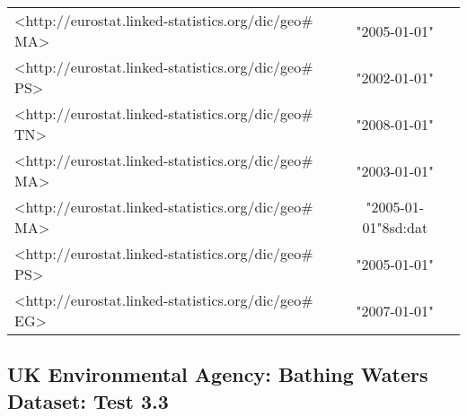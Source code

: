 \documentclass[a4paper,10pt]{article}
\begin{document}
\begin{table}[!tb]
\begin{center}
\begin{tabular}{l c}
 <http://eurostat.linked-statistics.org/dic/geo$\#$MA> & "2005-01-01"\\
<http://eurostat.linked-statistics.org/dic/geo$\#$PS> & "2002-01-01" \\
 <http://eurostat.linked-statistics.org/dic/geo$\#$TN> & "2008-01-01" \\
 <http://eurostat.linked-statistics.org/dic/geo$\#$MA> & "2003-01-01" \\
 <http://eurostat.linked-statistics.org/dic/geo$\#$MA> & "2005-01-01"^^xsd:dat \\
 <http://eurostat.linked-statistics.org/dic/geo$\#$PS> & "2005-01-01"\\
 <http://eurostat.linked-statistics.org/dic/geo$\#$EG> & "2007-01-01" \\

	\end{tabular}
	\label{protectedAreas(geo,timePeriod)}
	\end{center}
	\end{table}
		
		
		
\subsection{UK Environmental Agency: Bathing Waters Dataset: Test 3.3}
\label{ProtectedAreas 3.3}		
		
\end{document}

